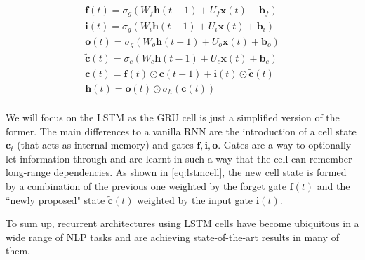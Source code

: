 \begin{equation} \label{eq:lstmcell}
	\begin{gathered}
		\mathbf{f}(t) = \sigma_g(W_f \mathbf{h}(t-1) + U_f\mathbf{x}(t) + \mathbf{b}_f) \\
		\mathbf{i}(t) = \sigma_g(W_i \mathbf{h}(t-1) + U_i \mathbf{x}(t) + \mathbf{b}_i) \\
		\mathbf{o}(t) = \sigma_g(W_o \mathbf{h}(t-1) + U_o \mathbf{x}(t) + \mathbf{b}_o) \\
		\mathbf{\tilde{c}}(t) = \sigma_c(W_c \mathbf{h}(t-1) + U_c \mathbf{x}(t) + \mathbf{b}_c) \\
		\mathbf{c}(t) = \mathbf{f}(t) \odot \mathbf{c}(t-1) + \mathbf{i}(t) \odot \mathbf{\tilde{c}}(t) \\
		\mathbf{h}(t) = \mathbf{o}(t) \odot \sigma_h(\mathbf{c}(t))\\
	\end{gathered}
\end{equation}


We will focus on the LSTM as the GRU cell is just a simplified version of the former. The main differences to a vanilla RNN are the introduction of a cell state $\mathbf{c}_t$ (that acts as internal memory) and gates $\mathbf{f},\mathbf{i},\mathbf{o}$. Gates are a way to optionally let information through and are learnt in such a way that the cell can remember long-range dependencies. As shown in \autoref{eq:lstmcell}, the new cell state is formed by a combination of the previous one weighted by the forget gate $\mathbf{f}(t)$ and the ``newly proposed" state $\mathbf{\tilde{c}}(t)$ weighted by the input gate $\mathbf{i}(t)$.

To sum up, recurrent architectures using LSTM cells have become ubiquitous in a wide range of NLP tasks and are achieving state-of-the-art results in many of them.
